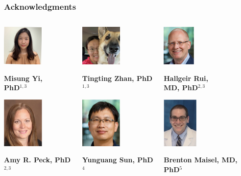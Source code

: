 \documentclass[t,8pt]{beamer}
\begin{document}
\begin{frame}
\frametitle{Acknowledgments}   

       \begin{columns}[T]
       
		      \begin{column}{0.2\textwidth}
			\includegraphics[height=0.8in] {Figures/Misung.pdf}
			   \caption{ \textbf{Misung Yi, \\PhD$^{1,3}$} }
		 \includegraphics[height=1in] {Figures/Amy.png}
				   \caption{\textbf{Amy R. Peck, PhD$^{2,3}$}}   			   
			       \end{column}
			       
		  \begin{column}{0.2\textwidth}
			\includegraphics[height=0.8in] {Figures/Tingting.pdf}
			  \caption{\textbf{Tingting Zhan, PhD$^{1,3}$}}
	          \includegraphics[height=1in] {Figures/Yunguang.png}
		       \caption{\textbf{Yunguang Sun, PhD$^4$}}	  			  
			       \end{column}	
			       	
	          \begin{column}{0.2\textwidth}
			\includegraphics[height=0.8in] {Figures/Rui.png}
			  \caption{\textbf{Hallgeir Rui,\\MD, PhD$^{2,3}$}}
		 \includegraphics[height=1in] {Figures/Maisel.png}
		 \caption{\textbf{Brenton Maisel, MD, PhD$^5$}}
			       \end{column}	
		      

\end{columns}
\end{frame}
\end{document}
